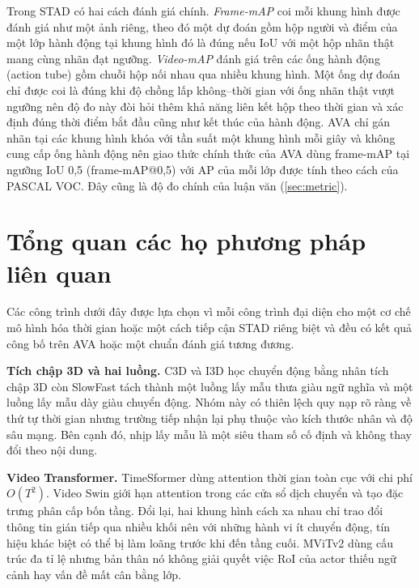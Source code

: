 Trong STAD có hai cách đánh giá chính. \emph{Frame-mAP} coi mỗi khung hình được đánh giá như một ảnh riêng, theo đó một dự đoán gồm hộp người và điểm của một lớp hành động tại khung hình đó là đúng nếu IoU với một hộp nhãn thật mang cùng nhãn đạt ngưỡng. \emph{Video-mAP} \cite{gkioxari2015tubes} đánh giá trên các ống hành động (action tube) gồm chuỗi hộp nối nhau qua nhiều khung hình. Một ống dự đoán chỉ được coi là đúng khi độ chồng lấp không--thời gian với ống nhãn thật vượt ngưỡng nên độ đo này đòi hỏi thêm khả năng liên kết hộp theo thời gian và xác định đúng thời điểm bắt đầu cũng như kết thúc của hành động. AVA \cite{gu2018ava} chỉ gán nhãn tại các khung hình khóa với tần suất một khung hình mỗi giây và không cung cấp ống hành động nên giao thức chính thức của AVA dùng frame-mAP tại ngưỡng IoU 0,5 (frame-mAP@0,5) với AP của mỗi lớp được tính theo cách của PASCAL VOC. Đây cũng là độ đo chính của luận văn (\cref{sec:metric}).

\section{Tổng quan các họ phương pháp liên quan}
\label{sec:survey}

Các công trình dưới đây được lựa chọn vì mỗi công trình đại diện cho một cơ chế mô hình hóa thời gian hoặc một cách tiếp cận STAD riêng biệt và đều có kết quả công bố trên AVA hoặc một chuẩn đánh giá tương đương.

\textbf{Tích chập 3D và hai luồng.} C3D \cite{tran2015c3d} và I3D \cite{carreira2017i3d} học chuyển động bằng nhân tích chập 3D còn SlowFast \cite{feichtenhofer2019slowfast} tách thành một luồng lấy mẫu thưa giàu ngữ nghĩa và một luồng lấy mẫu dày giàu chuyển động. Nhóm này có thiên lệch quy nạp rõ ràng về thứ tự thời gian nhưng trường tiếp nhận lại phụ thuộc vào kích thước nhân và độ sâu mạng. Bên cạnh đó, nhịp lấy mẫu là một siêu tham số cố định và không thay đổi theo nội dung.

\textbf{Video Transformer.} TimeSformer \cite{bertasius2021timesformer} dùng attention thời gian toàn cục với chi phí $O(T^2)$. Video Swin \cite{liu2022videoswin} giới hạn attention trong các cửa sổ dịch chuyển và tạo đặc trưng phân cấp bốn tầng. Đổi lại, hai khung hình cách xa nhau chỉ trao đổi thông tin gián tiếp qua nhiều khối nên với những hành vi ít chuyển động, tín hiệu khác biệt có thể bị làm loãng trước khi đến tầng cuối. MViTv2 \cite{li2022mvitv2} dùng cấu trúc đa tỉ lệ nhưng bản thân nó không giải quyết việc RoI của actor thiếu ngữ cảnh hay vấn đề mất cân bằng lớp.

